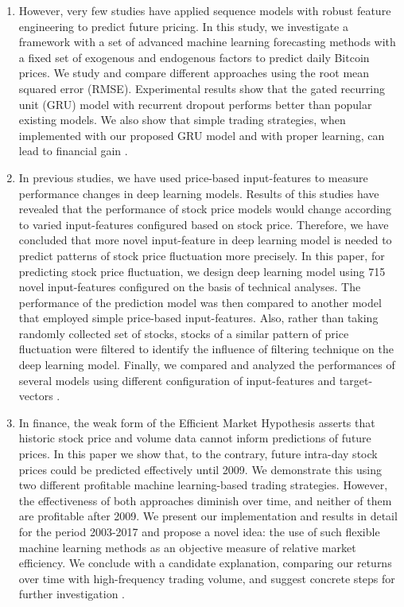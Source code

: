\documentclass[12pt,journal,compsoc]{IEEEtran}
\begin{document}
\begin{enumerate}
	\item  However, very few studies have applied sequence models with robust feature engineering to predict future pricing. In this study, we investigate a framework with a set of advanced machine learning forecasting methods with a fixed set of exogenous and endogenous factors to predict daily Bitcoin prices. We study and compare different approaches using the root mean squared error (RMSE). Experimental results show that the gated recurring unit (GRU) model with recurrent dropout performs better than popular existing models. We also show that simple trading strategies, when implemented with our proposed GRU model and with proper learning, can lead to financial gain \cite{dutta2020gated}.
	
	\item In previous studies, we have used price-based input-features to measure performance changes in deep learning models. Results of this studies have revealed that the performance of stock price models would change according to varied input-features configured based on stock price. Therefore, we have concluded that more novel input-feature in deep learning model is needed to predict patterns of stock price fluctuation more precisely. In this paper, for predicting stock price fluctuation, we design deep learning model using 715 novel input-features configured on the basis of technical analyses. The performance of the prediction model was then compared to another model that employed simple price-based input-features. Also, rather than taking randomly collected set of stocks, stocks of a similar pattern of price fluctuation were filtered to identify the influence of filtering technique on the deep learning model. Finally, we compared and analyzed the performances of several models using different configuration of input-features and target-vectors \cite{song2019study}.
	
	\item In finance, the weak form of the Efficient Market Hypothesis asserts that historic stock price and volume data cannot inform predictions of future prices. In this paper we show that, to the contrary, future intra-day stock prices could be predicted effectively until 2009. We demonstrate this using two different profitable machine learning-based trading strategies. However, the effectiveness of both approaches diminish over time, and neither of them are profitable after 2009. We present our implementation and results in detail for the period 2003-2017 and propose a novel idea: the use of such flexible machine learning methods as an objective measure of relative market efficiency. We conclude with a candidate explanation, comparing our returns over time with high-frequency trading volume, and suggest concrete steps for further investigation \cite{byrd2019intraday}. 
	

\end{enumerate}
\end{document}
